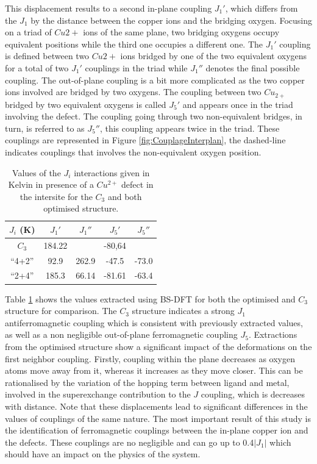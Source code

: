 \documentclass[12pt]{report}
\numberwithin{equation}{section}
\begin{document}
This displacement results to a second in-plane coupling $J_1'$, which differs from the $J_1$ by the distance between the copper ions and the bridging oxygen.
Focusing on a triad of $Cu{2+}$ ions of the same plane, two bridging oxygens occupy equivalent positions while the third one occupies a different one.
The $J_1'$ coupling is defined between two $Cu{2+}$ ions bridged by one of the two equivalent oxygens for a total of two $J_1'$ couplings in the triad while $J_1''$ denotes the final possible coupling.
The out-of-plane coupling is a bit more complicated as the two copper ions involved are bridged by two oxygens.
The coupling between two $Cu_{2+}$ bridged by two equivalent oxygens is called $J_5'$ and appears once in the triad involving the defect.
The coupling going through two non-equivalent bridges, in turn, is referred to as $J_5''$, this coupling appears twice in the triad.
These couplings are represented in Figure \ref{fig:CouplageInterplan}, the dashed-line indicates couplings that involves the non-equivalent oxygen position.


\begin{table}[!ht]
    \centering
    \begin{tabular}{c c c c c }
        \hline
        $J_i$ (K) & $J_1'$ & $J_1''$ & $J_5'$ & $J_5''$\\
        \hline
        $C_3$ & 184.22 & & -80,64 & \\
        ``4+2'' & 92.9 & 262.9 & -47.5 & -73.0\\
        ``2+4'' & 185.3 & 66.14 & -81.61 & -63.4\\
        \hline
    \end{tabular}
    \caption{Values of the $J_i$ interactions given in Kelvin in presence of a $Cu^{2+}$ defect in the intersite for the $C_3$ and both optimised structure.}
    \label{tab:DefautJ}
\end{table}

Table \ref{tab:DefautJ} shows the values extracted using BS-DFT for both the optimised and $C_3$ structure for comparison.
The $C_3$ structure indicates a strong $J_1$ antiferromagnetic coupling which is consistent with previously extracted values, as well as a non negligible out-of-plane ferromagnetic coupling $J_5$. 
Extractions from the optimised structure show a significant impact of the deformations on the first neighbor coupling.
Firstly, coupling within the plane decreases as oxygen atoms move away from it, whereas it increases as they move closer.
This can be rationalised by the variation of the hopping term between ligand and metal, involved in the superexchange contribution to the $J$ coupling, which is decreases with distance.
Note that these displacements lead to significant differences in the values of couplings of the same nature.
The most important result of this study is the identification of ferromagnetic couplings between the in-plane copper ion and the defects.
These couplings are no negligible and can go up to 0.4$|J_1|$ which should have an impact on the physics of the system.
\end{document}
